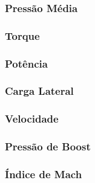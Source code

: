 \subsubsection*{Pressão Média}

\subsubsection*{Torque}

\subsubsection*{Potência}

\subsubsection*{Carga Lateral}

\subsubsection*{Velocidade}

\subsubsection*{Pressão de Boost}

\subsubsection*{Índice de Mach}